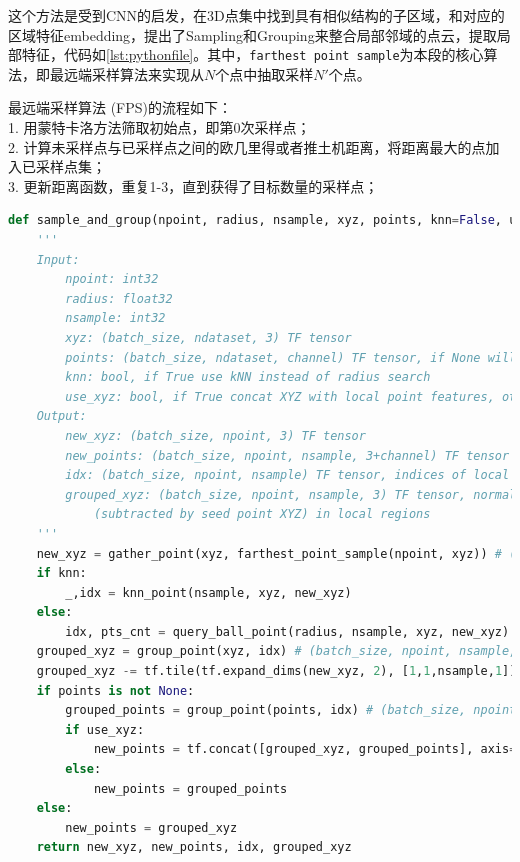 这个方法是受到CNN的启发，在3D点集中找到具有相似结构的子区域，和对应的区域特征embedding，提出了Sampling和Grouping来整合局部邻域的点云，提取局部特征，代码如\ref{lst:pythonfile}。其中，\texttt{farthest point sample}为本段的核心算法，即最远端采样算法来实现从$N$个点中抽取采样$N'$个点。

最远端采样算法 (FPS)的流程如下：\\
1. 用蒙特卡洛方法筛取初始点，即第0次采样点； \\
2. 计算未采样点与已采样点之间的欧几里得或者推土机距离，将距离最大的点加入已采样点集； \\
3. 更新距离函数，重复1-3，直到获得了目标数量的采样点； \\

\begin{lstlisting}[language=Python, caption={最远端采样算法}, label={lst:pythonfile}]
    def sample_and_group(npoint, radius, nsample, xyz, points, knn=False, use_xyz=True):
    '''
    Input:
        npoint: int32
        radius: float32
        nsample: int32
        xyz: (batch_size, ndataset, 3) TF tensor
        points: (batch_size, ndataset, channel) TF tensor, if None will just use xyz as points
        knn: bool, if True use kNN instead of radius search
        use_xyz: bool, if True concat XYZ with local point features, otherwise just use point features
    Output:
        new_xyz: (batch_size, npoint, 3) TF tensor
        new_points: (batch_size, npoint, nsample, 3+channel) TF tensor
        idx: (batch_size, npoint, nsample) TF tensor, indices of local points as in ndataset points
        grouped_xyz: (batch_size, npoint, nsample, 3) TF tensor, normalized point XYZs
            (subtracted by seed point XYZ) in local regions
    '''
    new_xyz = gather_point(xyz, farthest_point_sample(npoint, xyz)) # (batch_size, npoint, 3)
    if knn:
        _,idx = knn_point(nsample, xyz, new_xyz)
    else:
        idx, pts_cnt = query_ball_point(radius, nsample, xyz, new_xyz)
    grouped_xyz = group_point(xyz, idx) # (batch_size, npoint, nsample, 3)
    grouped_xyz -= tf.tile(tf.expand_dims(new_xyz, 2), [1,1,nsample,1]) # translation normalization
    if points is not None:
        grouped_points = group_point(points, idx) # (batch_size, npoint, nsample, channel)
        if use_xyz:
            new_points = tf.concat([grouped_xyz, grouped_points], axis=-1) # (batch_size, npoint, nample, 3+channel)
        else:
            new_points = grouped_points
    else:
        new_points = grouped_xyz
    return new_xyz, new_points, idx, grouped_xyz
\end{lstlisting}

